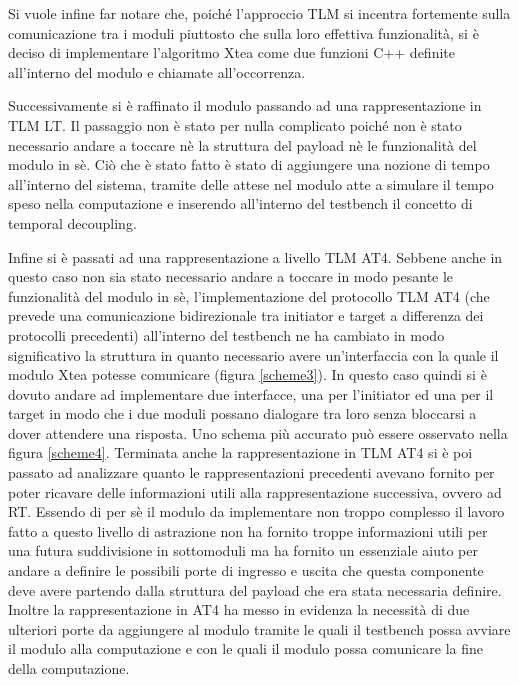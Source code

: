 \documentclass[]{IEEEtran}
\begin{document}
Si vuole infine far notare che, poiché l'approccio TLM si incentra fortemente sulla comunicazione tra i moduli piuttosto che sulla loro effettiva funzionalità, si è deciso di implementare l'algoritmo Xtea come due funzioni C++ definite all'interno del modulo e chiamate all'occorrenza.

Successivamente si è raffinato il modulo passando ad una rappresentazione in TLM LT. Il passaggio non è stato per nulla complicato poiché non è stato necessario andare a toccare nè la struttura del payload nè le funzionalità del modulo in sè. Ciò che è stato fatto è stato di aggiungere una nozione di tempo all'interno del sistema, tramite delle attese nel modulo atte a simulare il tempo speso nella computazione e inserendo all'interno del testbench il concetto di temporal decoupling. 

Infine si è passati ad una rappresentazione a livello TLM AT4. Sebbene anche in questo caso non sia stato necessario andare a toccare in modo pesante le funzionalità del modulo in sè, l'implementazione del protocollo TLM AT4 (che prevede una comunicazione bidirezionale tra initiator e target a differenza dei protocolli precedenti) all'interno del testbench ne ha cambiato in modo significativo la struttura in quanto necessario avere un'interfaccia con la quale il modulo Xtea potesse comunicare (figura \ref{scheme3}). In questo caso quindi si è dovuto andare ad implementare due interfacce, una per l'initiator ed una per il target in modo che i due moduli possano dialogare tra loro senza bloccarsi a dover attendere una risposta. Uno schema più accurato può essere osservato nella figura \ref{scheme4}. Terminata anche la rappresentazione in TLM AT4 si è poi passato ad analizzare quanto le rappresentazioni precedenti avevano fornito per poter ricavare delle informazioni utili alla rappresentazione successiva, ovvero ad RT. Essendo di per sè il modulo da implementare non troppo complesso il lavoro fatto a questo livello di astrazione non ha fornito troppe informazioni utili per una futura suddivisione in sottomoduli ma ha fornito un essenziale aiuto per andare a definire le possibili porte di ingresso e uscita che questa componente deve avere partendo dalla struttura del payload che era stata necessaria definire. Inoltre la rappresentazione in AT4 ha messo in evidenza la necessità di due ulteriori porte da aggiungere al modulo tramite le quali il testbench possa avviare il modulo alla computazione e con le quali il modulo possa comunicare la fine della computazione.
\end{document}
